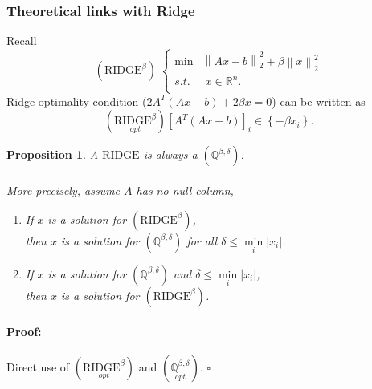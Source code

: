 \documentclass[fleqn]{report} %
\newtheorem{thm}{Proposition}[subsection]
\newenvironment{proof}{\paragraph{Proof:}}{\hfill$\square$}
\begin{document}
\subsubsection{Theoretical links with Ridge}
Recall
\begin{equation}
		(\text{RIDGE}^{\beta})\;
		\left\{
		\begin{array}{ll}\min & \left\|Ax-b\right\|^2_2 + \beta\left\|x\right\|_2^2\\
			s.t.&\;x\in\mathbb{R}^n.\\
		\end{array} 
		\right.
    \end{equation}
Ridge optimality condition ($2A^T(Ax-b) + 2\beta x = 0$) can be written as
\[
\left(\underset{opt}{\text{RIDGE}^{\beta}}\right)
\left[A^T(Ax-b)\right]_i\in 
\left\{ 
-\beta x_i\right\}.
\]
\begin{thm}A $\text{RIDGE}$ is always a $(\mathbb{Q}^{\beta,\delta})$.\\\\
More precisely, assume $A$ has no null column,
\begin{enumerate}
\item If $x$ is a solution for $(\text{RIDGE}^{\beta})$,\\ then $x$ is a solution for $(\mathbb{Q}^{\beta,\delta})$ for all $\delta\leq \underset{i}{\min}\left|x_i\right|$.
\item If $x$ is a solution for $(\mathbb{Q}^{\beta,\delta})$ and $\delta\leq \underset{i}{\min}\left|x_i\right|$,\\ then $x$ is a solution for $(\text{RIDGE}^{\beta})$.
\end{enumerate}
\end{thm}
\begin{proof}
    Direct use of $\left(\underset{opt}{\text{RIDGE}^{\beta}}\right)$ and $\left(\underset{opt}{\mathbb{Q}^{\beta,\delta}}\right)$.
\end{proof}
\end{document}
